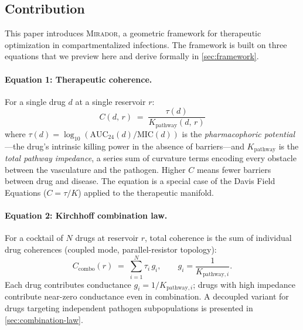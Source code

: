 \documentclass[11pt]{article}
\theoremstyle{plain}
\theoremstyle{definition}
\newcommand{\mirador}{\textsc{Mirador}}
\newcommand{\Kpath}{K_{\mathrm{pathway}}}
\newcommand{\Ccombo}{C_{\mathrm{combo}}}
\newcommand{\AUCday}{\mathrm{AUC}_{24}}
\newcommand{\MICval}{\mathrm{MIC}}
\begin{document}
\subsection{Contribution}
\label{sec:contribution}

This paper introduces \mirador{}, a geometric framework for
therapeutic optimization in compartmentalized infections. The
framework is built on three equations that we preview here and
derive formally in \cref{sec:framework}.

\paragraph{Equation 1: Therapeutic coherence.}
For a single drug $d$ at a single reservoir $r$:
%
\begin{equation}
  \label{eq:coherence-preview}
  \boxed{\;C(d,\, r) \;=\; \frac{\tau(d)}{\Kpath(d,\, r)}\;}
\end{equation}
%
where $\tau(d) = \log_{10}(\AUCday(d) / \MICval(d))$ is the
\emph{pharmacophoric potential}---the drug's intrinsic killing
power in the absence of barriers---and $\Kpath$ is the
\emph{total pathway impedance}, a series sum of curvature terms
encoding every obstacle between the vasculature and the pathogen.
Higher $C$ means fewer barriers between drug and disease. The
equation is a special case of the Davis Field Equations ($C = \tau/K$)
applied to the therapeutic manifold.

\paragraph{Equation 2: Kirchhoff combination law.}
For a cocktail of $N$ drugs at reservoir $r$, total coherence is the
sum of individual drug coherences (coupled mode, parallel-resistor
topology):
%
\begin{equation}
  \label{eq:combination-preview}
  \Ccombo(r) \;=\;
  \sum_{i=1}^{N} \tau_i \, g_i,
  \qquad
  g_i = \frac{1}{K_{\mathrm{pathway},i}}.
\end{equation}
%
Each drug contributes conductance $g_i = 1/K_{\mathrm{pathway},i}$; drugs with
high impedance contribute near-zero conductance even in combination.
A decoupled variant for drugs targeting independent pathogen
subpopulations is presented in \cref{sec:combination-law}.
\end{document}
